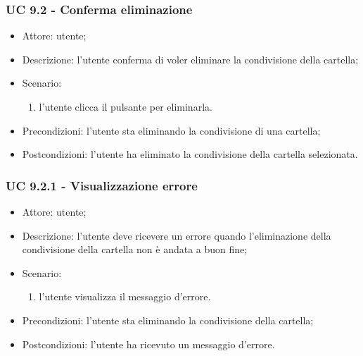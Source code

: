    \subsubsection{UC 9.2 - Conferma eliminazione} \label{sec: UC 9.2}
    \begin{itemize}
        \item Attore: utente;
        \item Descrizione: l'utente conferma di voler eliminare la condivisione della cartella;
        \item Scenario:
        \begin{enumerate}
        \item l'utente clicca il pulsante per eliminarla.
        \end{enumerate}
        \item Precondizioni: l'utente sta eliminando la condivisione di una cartella;
        \item Postcondizioni: l'utente ha eliminato la condivisione della cartella selezionata.
    \end{itemize}

    \subsubsection{UC 9.2.1 - Visualizzazione errore } \label{sec: UC 9.2.1}
    \begin{itemize}
        \item Attore: utente;
        \item Descrizione: l'utente deve ricevere un errore quando l'eliminazione della condivisione della cartella non è andata a buon fine;
        \item Scenario:
        \begin{enumerate}
        \item l'utente visualizza il messaggio d'errore.
        \end{enumerate}   
        \item Precondizioni: l'utente sta eliminando la condivisione della cartella;
        \item Postcondizioni: l'utente ha ricevuto un messaggio d'errore.
    \end{itemize}

